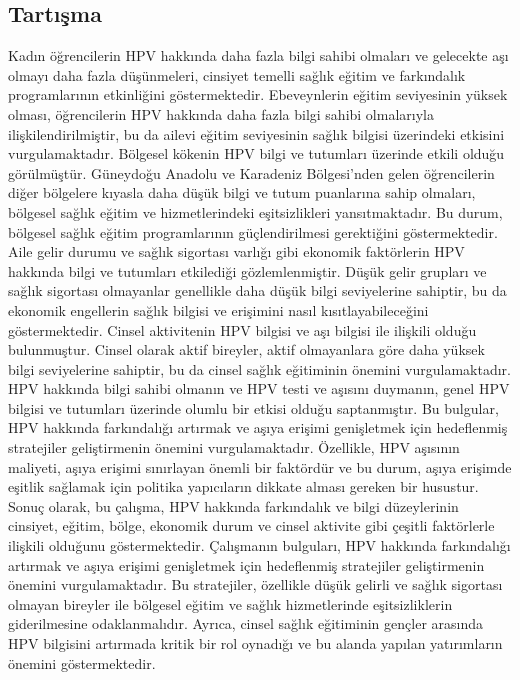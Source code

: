 \documentclass[turkish]{article}
\begin{document}
\subsection{Tartışma}
Kadın öğrencilerin HPV hakkında daha fazla bilgi sahibi olmaları ve gelecekte aşı olmayı daha fazla düşünmeleri, cinsiyet temelli sağlık eğitim ve farkındalık programlarının etkinliğini göstermektedir. Ebeveynlerin eğitim seviyesinin yüksek olması, öğrencilerin HPV hakkında daha fazla bilgi sahibi olmalarıyla ilişkilendirilmiştir, bu da ailevi eğitim seviyesinin sağlık bilgisi üzerindeki etkisini vurgulamaktadır.
Bölgesel kökenin HPV bilgi ve tutumları üzerinde etkili olduğu görülmüştür. Güneydoğu Anadolu ve Karadeniz Bölgesi’nden gelen öğrencilerin diğer bölgelere kıyasla daha düşük bilgi ve tutum puanlarına sahip olmaları, bölgesel sağlık eğitim ve hizmetlerindeki eşitsizlikleri yansıtmaktadır. Bu durum, bölgesel sağlık eğitim programlarının güçlendirilmesi gerektiğini göstermektedir.
Aile gelir durumu ve sağlık sigortası varlığı gibi ekonomik faktörlerin HPV hakkında bilgi ve tutumları etkilediği gözlemlenmiştir. Düşük gelir grupları ve sağlık sigortası olmayanlar genellikle daha düşük bilgi seviyelerine sahiptir, bu da ekonomik engellerin sağlık bilgisi ve erişimini nasıl kısıtlayabileceğini göstermektedir.
Cinsel aktivitenin HPV bilgisi ve aşı bilgisi ile ilişkili olduğu bulunmuştur. Cinsel olarak aktif bireyler, aktif olmayanlara göre daha yüksek bilgi seviyelerine sahiptir, bu da cinsel sağlık eğitiminin önemini vurgulamaktadır.
HPV hakkında bilgi sahibi olmanın ve HPV testi ve aşısını duymanın, genel HPV bilgisi ve tutumları üzerinde olumlu bir etkisi olduğu saptanmıştır. Bu bulgular, HPV hakkında farkındalığı artırmak ve aşıya erişimi genişletmek için hedeflenmiş stratejiler geliştirmenin önemini vurgulamaktadır. Özellikle, HPV aşısının maliyeti, aşıya erişimi sınırlayan önemli bir faktördür ve bu durum, aşıya erişimde eşitlik sağlamak için politika yapıcıların dikkate alması gereken bir husustur.
Sonuç olarak, bu çalışma, HPV hakkında farkındalık ve bilgi düzeylerinin cinsiyet, eğitim, bölge, ekonomik durum ve cinsel aktivite gibi çeşitli faktörlerle ilişkili olduğunu göstermektedir. Çalışmanın bulguları, HPV hakkında farkındalığı artırmak ve aşıya erişimi genişletmek için hedeflenmiş stratejiler geliştirmenin önemini vurgulamaktadır. Bu stratejiler, özellikle düşük gelirli ve sağlık sigortası olmayan bireyler ile bölgesel eğitim ve sağlık hizmetlerinde eşitsizliklerin giderilmesine odaklanmalıdır. Ayrıca, cinsel sağlık eğitiminin gençler arasında HPV bilgisini artırmada kritik bir rol oynadığı ve bu alanda yapılan yatırımların önemini göstermektedir.
\newpage
\twocolumn
\end{document}
